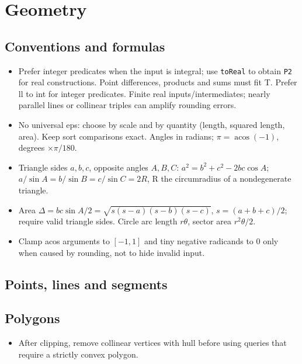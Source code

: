 \chapter{Geometry}

\section{Conventions and formulas}
\begin{itemize}[nosep,leftmargin=*]
\item Prefer integer predicates when the input is integral; use \texttt{toReal} to obtain
\texttt{P2} for real constructions. Point differences, products
and sums must fit T. Prefer ll to int for integer predicates. Finite real inputs/intermediates; nearly parallel
lines or collinear triples can amplify rounding errors.
\item No universal eps: choose by scale and by quantity (length, squared
length, area). Keep sort comparisons exact. Angles in radians;
$\pi=\operatorname{acos}(-1)$, degrees $\times\pi/180$.
\item Triangle sides $a,b,c$, opposite angles $A,B,C$:
$a^2=b^2+c^2-2bc\cos A$;
$a/\sin A=b/\sin B=c/\sin C=2R$, R the circumradius
of a nondegenerate triangle.
\item Area $\Delta=bc\sin A/2=\sqrt{s(s-a)(s-b)(s-c)}$,
$s=(a+b+c)/2$; require valid triangle sides.
Circle arc length $r\theta$, sector area $r^2\theta/2$.
\item Clamp acos arguments to $[-1,1]$ and tiny negative radicands to 0
only when caused by rounding, not to hide invalid input.
\end{itemize}

\section{Points, lines and segments}

\section{Polygons}
\begin{itemize}[nosep,leftmargin=*]
\item After clipping, remove collinear vertices with hull before using
queries that require a strictly convex polygon.
\end{itemize}

